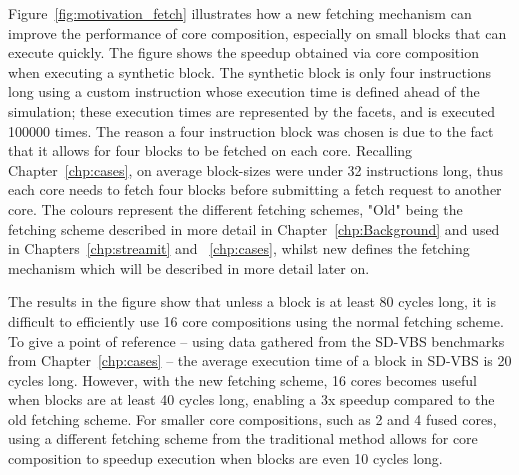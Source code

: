 Figure~\ref{fig:motivation_fetch} illustrates how a new fetching mechanism can improve the performance of core composition, especially on small blocks that can execute quickly.
The figure shows the speedup obtained via core composition when executing a synthetic block.
The synthetic block is only four instructions long using a custom instruction whose execution time is defined ahead of the simulation; these execution times are represented by the facets, and is executed 100000 times.
The reason a four instruction block was chosen is due to the fact that it allows for four blocks to be fetched on each core.
Recalling Chapter~\ref{chp:cases}, on average block-sizes were under 32 instructions long, thus each core needs to fetch four blocks before submitting a fetch request to another core.
The colours represent the different fetching schemes, "Old" being the fetching scheme described in more detail in Chapter~\ref{chp:Background} and used in Chapters~\ref{chp:streamit} and ~\ref{chp:cases}, whilst new defines the fetching mechanism which will be described in more detail later on.

The results in the figure show that unless a block is at least 80 cycles long, it is difficult to efficiently use 16 core compositions using the normal fetching scheme.
To give a point of reference -- using data gathered from the SD-VBS benchmarks from Chapter~\ref{chp:cases} -- the average execution time of a block in SD-VBS is 20 cycles long.
However, with the new fetching scheme, 16 cores becomes useful when blocks are at least 40 cycles long, enabling a 3x speedup compared to the old fetching scheme.
For smaller core compositions, such as 2 and 4 fused cores, using a different fetching scheme from the traditional method allows for core composition to speedup execution when blocks are even 10 cycles long.
